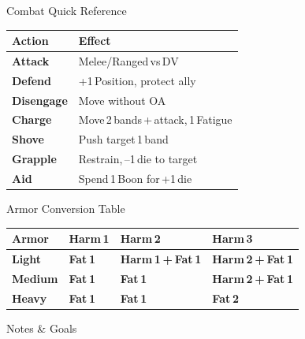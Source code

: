 \documentclass[10pt]{article}
\begin{document}
\begin{minipage}[t]{0.48\linewidth}
    \begin{charbox}{Combat Quick Reference}
        \begin{tabular}{>{\bfseries}p{3cm} p{4.5cm}}
            \toprule
            \textbf{Action} & \textbf{Effect}\\
            \midrule
            Attack & Melee/Ranged vs DV\\
            Defend & +1 Position, protect ally\\
            Disengage & Move without OA\\
            Charge & Move 2 bands + attack, 1 Fatigue\\
            Shove & Push target 1 band\\
            Grapple & Restrain, --1 die to target\\
            Aid & Spend 1 Boon for +1 die\\
            \bottomrule
        \end{tabular}
    \end{charbox}
    
    \vspace{0.5em}
    
    \begin{charbox}{Armor Conversion Table}
        \begin{tabular}{>{\bfseries}p{1.5cm} >{\bfseries}p{1.5cm} >{\bfseries}p{1.5cm} >{\bfseries}p{1.5cm}}
            \toprule
            \textbf{Armor} & \textbf{Harm 1} & \textbf{Harm 2} & \textbf{Harm 3}\\
            \midrule
            Light   & Fat 1 & Harm 1 + Fat 1 & Harm 2 + Fat 1\\
            Medium  & Fat 1 & Fat 1 & Harm 2 + Fat 1\\
            Heavy   & Fat 1 & Fat 1 & Fat 2\\
            \bottomrule
        \end{tabular}
    \end{charbox}
\end{minipage}
\vspace{0.5em}
\begin{charbox}{Notes \& Goals}
    \vspace{2cm}
\end{charbox}
\newpage


\end{document}
